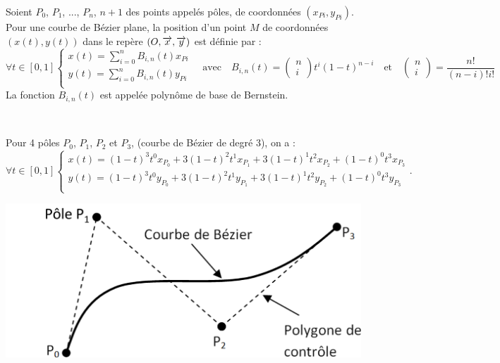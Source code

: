 \documentclass[10pt,fleqn]{article} %
\begin{document}
\begin{defi}
Soient $P_0$, $P_1$, ..., $P_{n}$, $n+1$ des points appelés pôles, de coordonnées $\left( x_{Pi},y_{Pi} \right)$. %
Pour une courbe de Bézier plane, la position d'un point $M$ de coordonnées $\left( x(t),y(t) \right)$ dans le repère  $\left(O,\overrightarrow{x},\overrightarrow{y} \right)$ est définie par :
$$
\forall t \in [0,1]
\left\{
\begin{array}{l}
x(t)= \sum\limits_{i=0}^{n} B_{i,n}(t) x_{Pi} \\
y(t)= \sum\limits_{i=0}^{n} B_{i,n}(t) y_{Pi} \\
\end{array}
\right.
\quad \text{avec} \quad B_{i,n}(t) = \begin{pmatrix} n \\ i\end{pmatrix} t^i \left(1-t\right)^{n-i}
\quad \text{et} \quad  \begin{pmatrix} n \\ i\end{pmatrix} = \dfrac{n!}{\left(n-i \right) ! i !}
$$
La fonction $B_{i,n}(t)$ est appelée polynôme de base de Bernstein.
\end{defi}

\begin{exemple}~\\
\begin{minipage}[c]{0.7\linewidth}
Pour 4 pôles $P_0$, $P_1$, $P_2$ et $P_3$, (courbe de Bézier de degré 3), on a : 
$$
\forall t \in [0,1]
\left\{
\begin{array}{l}
x(t)=  \left(1-t \right)^3 t^0 x_{P_0} +3\left(1-t \right)^2 t^1 x_{P_1} +3\left(1-t \right)^1 t^2 x_{P_2} +\left(1-t \right)^0 t^3 x_{P_3}\\
y(t)=  \left(1-t \right)^3 t^0 y_{P_0} +3\left(1-t \right)^2 t^1 y_{P_1} +3\left(1-t \right)^1 t^2 y_{P_2} +\left(1-t \right)^0 t^3 y_{P_3}\\
\end{array}
\right..
$$ 
\end{minipage} \hfill
\begin{minipage}[c]{0.27\linewidth}
\includegraphics[width=\linewidth]{images/Courbe}
\end{minipage}
\end{exemple}
\end{document}
